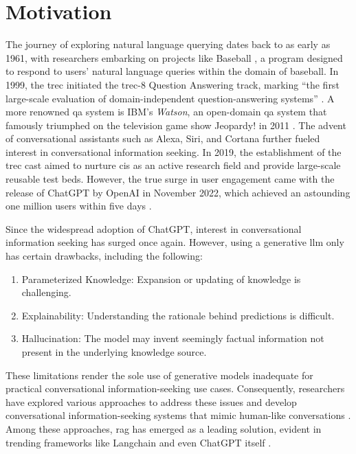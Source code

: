 \section{Motivation}

The journey of exploring natural language querying dates back to as early as 1961, with researchers embarking on projects like Baseball \cite{green_baseball_1961}, a program designed to respond to users' natural language queries within the domain of baseball. In 1999, the \gls{trec} initiated the \gls{trec}-8 Question Answering track, marking \enquote{the first large-scale evaluation of domain-independent question-answering systems} \cite{voorhees_trec-8_1999}. A more renowned \gls{qa} system is IBM's \textit{Watson}, an open-domain \gls{qa} system that famously triumphed on the television game show Jeopardy! in 2011 \cite{ferrucci_introduction_2012}. The advent of conversational assistants such as Alexa, Siri, and Cortana further fueled interest in conversational information seeking. In 2019, the establishment of the \gls{trec} \gls{cast} aimed to nurture \gls{cis} as an active research field and provide large-scale reusable test beds. However, the true surge in user engagement came with the release of ChatGPT by OpenAI in November 2022, which achieved an astounding one million users within five days \cite{demandsage2022chatgpt}.

Since the widespread adoption of ChatGPT, interest in conversational information seeking has surged once again. However, using a generative \gls{llm} only has certain drawbacks, including the following:

\begin{enumerate}
    \item Parameterized Knowledge: Expansion or updating of knowledge is challenging.
    \item Explainability: Understanding the rationale behind predictions is difficult.
    \item Hallucination: The model may invent seemingly factual information not present in the underlying knowledge source.
\end{enumerate}

These limitations render the sole use of generative models inadequate for practical conversational information-seeking use cases. Consequently, researchers have explored various approaches to address these issues and develop conversational information-seeking systems that mimic human-like conversations \cite{ferrucci_introduction_2012,guu_realm_2020,lewis_retrieval-augmented_2021,nakano_webgpt_2022}. Among these approaches, \gls{rag} \cite{lewis_retrieval-augmented_2021} has emerged as a leading solution, evident in trending frameworks like Langchain \cite{noauthor_question_nodate} and even ChatGPT itself \cite{noauthor_chatgpt_2023}.

